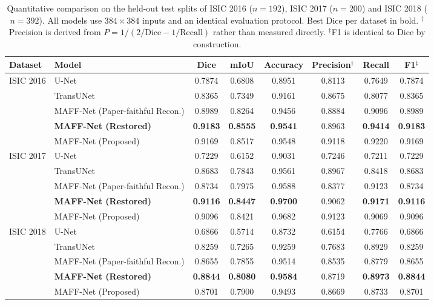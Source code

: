 \begin{table}[t]
\centering
\caption{Quantitative comparison on the held-out test splits of ISIC 2016 ($n=192$), ISIC 2017 ($n=200$) and ISIC 2018 ($n=392$). All models use $384\times384$ inputs and an identical evaluation protocol. Best Dice per dataset in bold. $^{\dagger}$Precision is derived from $P=1/(2/\mathrm{Dice}-1/\mathrm{Recall})$ rather than measured directly. $^{\ddagger}$F1 is identical to Dice by construction.}
\label{tab:benchmark}
\begin{tabular}{llcccccc}
\toprule
Dataset & Model & Dice & mIoU & Accuracy & Precision$^{\dagger}$ & Recall & F1$^{\ddagger}$ \\
\midrule
ISIC 2016 & U-Net & 0.7874 & 0.6808 & 0.8951 & 0.8113 & 0.7649 & 0.7874 \\
 & TransUNet & 0.8365 & 0.7349 & 0.9161 & 0.8675 & 0.8077 & 0.8365 \\
 & MAFF-Net (Paper-faithful Recon.) & 0.8989 & 0.8264 & 0.9456 & 0.8884 & 0.9096 & 0.8989 \\
 & \textbf{MAFF-Net (Restored)} & \textbf{0.9183} & \textbf{0.8555} & \textbf{0.9541} & 0.8963 & \textbf{0.9414} & \textbf{0.9183} \\
 & MAFF-Net (Proposed) & 0.9169 & 0.8517 & 0.9548 & 0.9118 & 0.9220 & 0.9169 \\
\midrule
ISIC 2017 & U-Net & 0.7229 & 0.6152 & 0.9031 & 0.7246 & 0.7211 & 0.7229 \\
 & TransUNet & 0.8683 & 0.7843 & 0.9561 & 0.8967 & 0.8418 & 0.8683 \\
 & MAFF-Net (Paper-faithful Recon.) & 0.8734 & 0.7975 & 0.9588 & 0.8377 & 0.9123 & 0.8734 \\
 & \textbf{MAFF-Net (Restored)} & \textbf{0.9116} & \textbf{0.8447} & \textbf{0.9700} & 0.9062 & \textbf{0.9171} & \textbf{0.9116} \\
 & MAFF-Net (Proposed) & 0.9096 & 0.8421 & 0.9682 & 0.9123 & 0.9069 & 0.9096 \\
\midrule
ISIC 2018 & U-Net & 0.6866 & 0.5714 & 0.8732 & 0.6154 & 0.7766 & 0.6866 \\
 & TransUNet & 0.8259 & 0.7265 & 0.9259 & 0.7683 & 0.8929 & 0.8259 \\
 & MAFF-Net (Paper-faithful Recon.) & 0.8655 & 0.7855 & 0.9514 & 0.8535 & 0.8779 & 0.8655 \\
 & \textbf{MAFF-Net (Restored)} & \textbf{0.8844} & \textbf{0.8080} & \textbf{0.9584} & 0.8719 & \textbf{0.8973} & \textbf{0.8844} \\
 & MAFF-Net (Proposed) & 0.8701 & 0.7900 & 0.9493 & 0.8669 & 0.8733 & 0.8701 \\
\bottomrule
\end{tabular}
\end{table}
